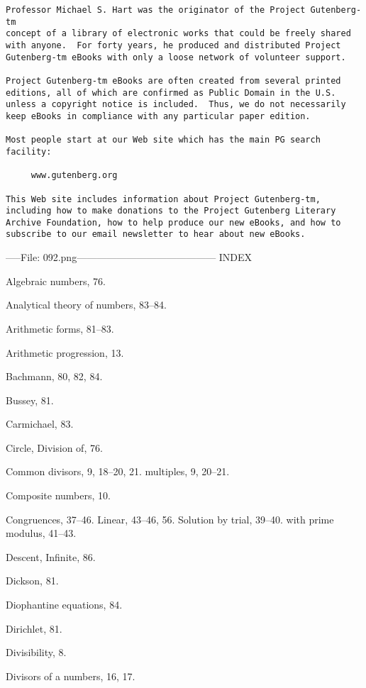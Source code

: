 \documentclass[oneside]{book}
\begin{document}
\begin{verbatim}
Professor Michael S. Hart was the originator of the Project Gutenberg-tm
concept of a library of electronic works that could be freely shared
with anyone.  For forty years, he produced and distributed Project
Gutenberg-tm eBooks with only a loose network of volunteer support.

Project Gutenberg-tm eBooks are often created from several printed
editions, all of which are confirmed as Public Domain in the U.S.
unless a copyright notice is included.  Thus, we do not necessarily
keep eBooks in compliance with any particular paper edition.

Most people start at our Web site which has the main PG search facility:

     www.gutenberg.org

This Web site includes information about Project Gutenberg-tm,
including how to make donations to the Project Gutenberg Literary
Archive Foundation, how to help produce our new eBooks, and how to
subscribe to our email newsletter to hear about new eBooks.

\end{verbatim}
\normalsize

\iffalse
-----File: 092.png---\ggna{}\----------------------------------------
INDEX

Algebraic numbers, 76.

Analytical theory of numbers, 83--84.

Arithmetic forms, 81--83.

Arithmetic progression, 13.



Bachmann, 80, 82, 84.

Bussey, 81.



Carmichael, 83.

Circle, Division of, 76.

Common divisors, 9, 18--20, 21.
  multiples, 9, 20--21.

Composite numbers, 10.

Congruences, 37--46.
  Linear, 43--46, 56.
  Solution by trial, 39--40.
  with prime modulus, 41--43.



Descent, Infinite, 86.

Dickson, 81.

Diophantine equations, 84.

Dirichlet, 81.

Divisibility, 8.

Divisors of a numbers, 16, 17.
\end{document}
